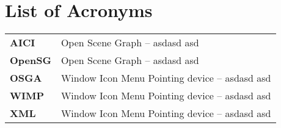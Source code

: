 \chapter*{List of Acronyms}


\begin{tabular}{ll}

\textbf{AICI} & Open Scene Graph -- asdasd asd \\

\textbf{OpenSG} & Open Scene Graph -- asdasd asd \\

\textbf{OSGA} & Window Icon Menu Pointing device -- asdasd asd \\

\textbf{WIMP} & Window Icon Menu Pointing device -- asdasd asd \\

\textbf{XML} & Window Icon Menu Pointing device -- asdasd asd \\

\end{tabular}
